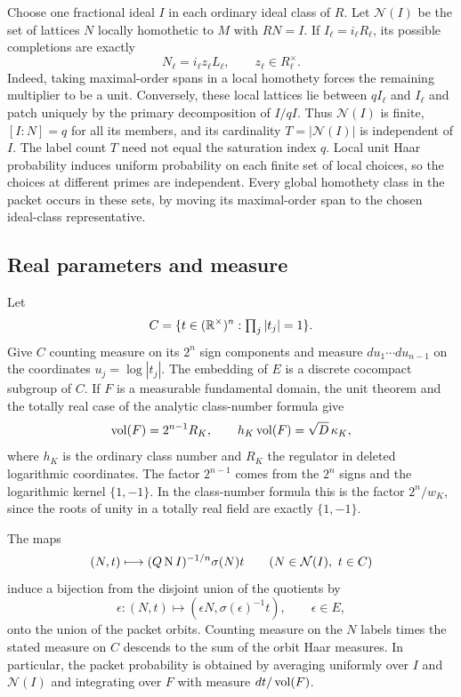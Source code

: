 Choose one fractional ideal $I$ in each ordinary ideal class of $R$.
Let $\mathcal N(I)$ be the set of lattices $N$ locally homothetic to $M$
with $RN=I$. If $I_\ell=i_\ell R_\ell$, its possible completions are
exactly
\begin{equation}\label{eq:local-choices}
 N_\ell=i_\ell z_\ell L_\ell,\qquad z_\ell\in R_\ell^\times.
\end{equation}
Indeed, taking maximal-order spans in a local homothety forces the
remaining multiplier to be a unit. Conversely, these local lattices
lie between $qI_\ell$ and $I_\ell$ and patch uniquely by the primary
decomposition of $I/qI$. Thus $\mathcal N(I)$ is finite,
$[I:N]=q$ for all its members, and its cardinality
$T=|\mathcal N(I)|$ is independent of $I$. The label count $T$ need
not equal the saturation index $q$. Local unit Haar probability induces
uniform probability on each finite set of local choices, so the choices at different
primes are independent. Every global homothety class in the
packet occurs in these sets, by moving its maximal-order span
to the chosen ideal-class representative.

\subsection{Real parameters and measure}

Let
\[
 C=\{t\in(\mathbb R^\times)^n:\textstyle\prod_j|t_j|=1\}.
\]
Give $C$ counting measure on its $2^n$ sign components and measure
$du_1\cdots du_{n-1}$ on the coordinates $u_j=\log|t_j|$.
The embedding of $E$ is a discrete cocompact subgroup of $C$.
If $F$ is a measurable fundamental domain, the unit theorem and
the totally real case of the analytic class-number formula
\cite[Theorem~19.12]{Sutherland2021} give
\begin{equation}\label{eq:unit-volume}
 \operatorname{vol}(F)=2^{n-1}R_K,\qquad
 h_K\operatorname{vol}(F)=\sqrt D\,\kappa_K,
\end{equation}
where $h_K$ is the ordinary class number and $R_K$ the regulator
in deleted logarithmic coordinates. The factor $2^{n-1}$ comes
from the $2^n$ signs and the logarithmic kernel $\{1,-1\}$.
In the class-number formula this is the factor $2^n/w_K$, since
the roots of unity in a totally real field are exactly $\{1,-1\}$.

\begin{lemma}\label{lem:packet-model}
The maps
\[
 (N,t)\longmapsto (Q\operatorname{N} I)^{-1/n}\sigma(N)t
 \qquad (N\in\mathcal N(I),\ t\in C)
\]
induce a bijection from the disjoint union of the quotients by
\[
 \epsilon:(N,t)\longmapsto
       (\epsilon N,\sigma(\epsilon)^{-1}t),\qquad \epsilon\in E,
\]
onto the union of the packet orbits.
Counting measure on the $N$ labels times the stated measure on $C$
descends to the sum of the orbit Haar measures. In particular,
the packet probability is obtained by averaging uniformly over $I$
and $\mathcal N(I)$ and integrating over $F$ with measure
$dt/\operatorname{vol}(F)$.
\end{lemma}

